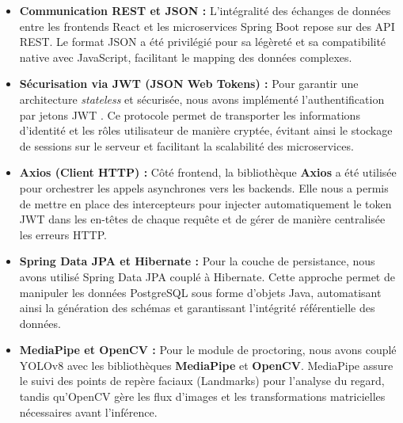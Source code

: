 \begin{itemize}
    \item \textbf{Communication REST et JSON :} 
    L'intégralité des échanges de données entre les frontends React et les microservices Spring Boot repose sur des API REST. Le format JSON a été privilégié pour sa légèreté et sa compatibilité native avec JavaScript, facilitant le mapping des données complexes.
    
    \item \textbf{Sécurisation via JWT (JSON Web Tokens) :} 
    Pour garantir une architecture \textit{stateless} et sécurisée, nous avons implémenté l'authentification par jetons JWT \cite{mahindrakar2020jwt}. Ce protocole permet de transporter les informations d'identité et les rôles utilisateur de manière cryptée, évitant ainsi le stockage de sessions sur le serveur et facilitant la scalabilité des microservices.
    
    \item \textbf{Axios (Client HTTP) :} 
    Côté frontend, la bibliothèque \textbf{Axios} a été utilisée pour orchestrer les appels asynchrones vers les backends. Elle nous a permis de mettre en place des intercepteurs pour injecter automatiquement le token JWT dans les en-têtes de chaque requête et de gérer de manière centralisée les erreurs HTTP.
    
    \item \textbf{Spring Data JPA et Hibernate :} 
    Pour la couche de persistance, nous avons utilisé Spring Data JPA couplé à Hibernate. Cette approche permet de manipuler les données PostgreSQL sous forme d'objets Java, automatisant ainsi la génération des schémas et garantissant l'intégrité référentielle des données.
    
    \item \textbf{MediaPipe et OpenCV :} 
    Pour le module de proctoring, nous avons couplé YOLOv8 avec les bibliothèques \textbf{MediaPipe} \cite{lugaresi2019mediapipe} et \textbf{OpenCV}. MediaPipe assure le suivi des points de repère faciaux (Landmarks) pour l'analyse du regard, tandis qu'OpenCV gère les flux d'images et les transformations matricielles nécessaires avant l'inférence.
\end{itemize}


